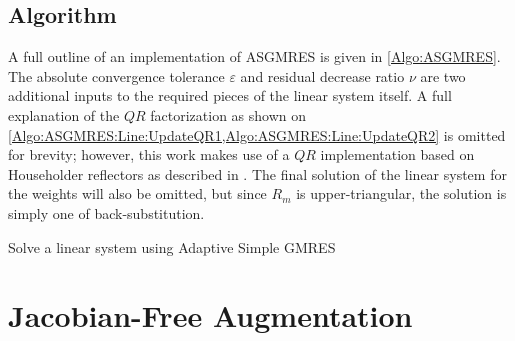 \documentclass[12pt]{../UWMadThesis}
\begin{document}
\subsection{Algorithm}

A full outline of an implementation of ASGMRES is given in \cref{Algo:ASGMRES}.
The absolute convergence tolerance $\varepsilon$ and residual decrease ratio $\nu$ are two additional inputs to the required pieces of the linear system itself.
A full explanation of the $QR$ factorization as shown on \cref{Algo:ASGMRES:Line:UpdateQR1,Algo:ASGMRES:Line:UpdateQR2} is omitted for brevity; however, this work makes use of a $QR$ implementation based on Householder reflectors as described in \cite{datta_numerical_2010}.
The final solution of the linear system for the weights will also be omitted, but since $R_m$ is upper-triangular, the solution is simply one of back-substitution.

\begin{algorithm}[t]
    \caption{Solve a linear system using Adaptive Simple GMRES}
    \label{Algo:ASGMRES}
\end{algorithm}



\clearpage
\section{Jacobian-Free Augmentation}
\end{document}
